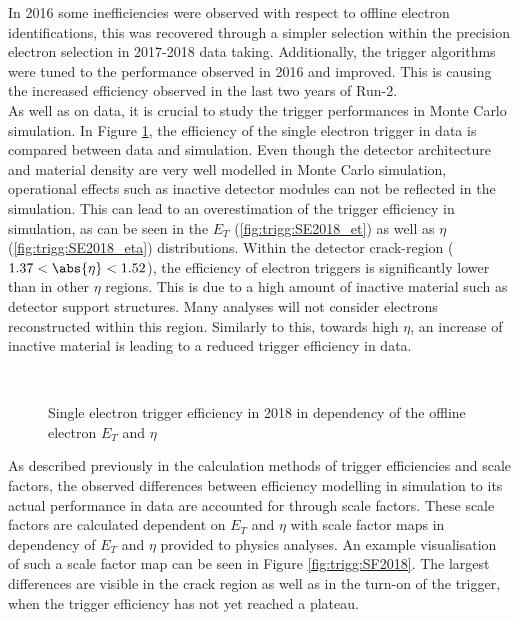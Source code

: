 In 2016 some inefficiencies were observed with respect to offline electron identifications,  this was recovered through a simpler selection within the precision electron selection in 2017-2018 data taking. 
Additionally,  the trigger algorithms were tuned to the performance observed in 2016 and improved.  This is causing the increased efficiency observed in the last two years of Run-2. \\
As well as on data,  it is crucial to study the trigger performances in Monte Carlo simulation.
In Figure \ref{fig:trigg:SE2018},  the efficiency of the single electron trigger in data is compared between data and simulation. 
Even though the detector architecture and material density are very well modelled in Monte Carlo simulation,  operational effects such as inactive detector modules can not be reflected in the simulation.  
This can lead to an overestimation of the trigger efficiency in simulation,  as can be seen in the $E_T$ (\ref{fig:trigg:SE2018_et}) as well as $\eta$ (\ref{fig:trigg:SE2018_eta}) distributions. 
Within the detector crack-region ($ 1.37 < \abs{\eta} < 1.52$),  the efficiency of electron triggers is significantly lower than in other $\eta$ regions.  This is due to a high amount of inactive material such as detector support structures.  Many analyses will not consider electrons reconstructed within this region. 
Similarly to this,  towards high $\eta$,  an increase of inactive material is leading to a reduced trigger efficiency in data.



\begin{figure}[h]
    \centering
  \\
 \caption{Single electron trigger efficiency in 2018 in dependency of the offline electron $E_T$ and $\eta$ \label{fig:trigg:SE2018}}
\end{figure}

As described previously in the calculation methods of trigger efficiencies and scale factors, the observed differences between efficiency modelling in simulation to its actual performance in data are accounted for through scale factors. 
These scale factors are calculated dependent on $E_T$ and $\eta$ with scale factor maps in dependency of $E_T$ and $\eta$ provided to physics analyses.
An example visualisation of such a scale factor map can be seen in Figure \ref{fig:trigg:SF2018}. The largest differences are visible in the crack region as well as in the turn-on of the trigger,  when the trigger efficiency has not yet reached a plateau. 

